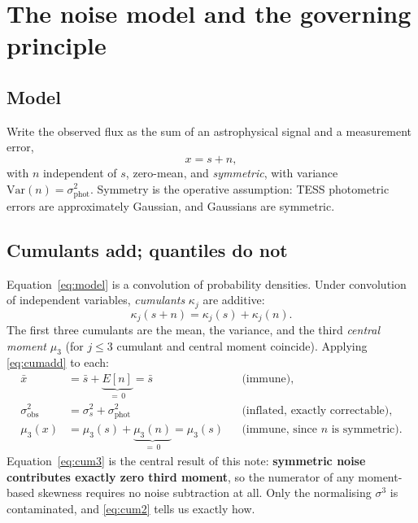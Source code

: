 \documentclass[11pt]{article}
\newcommand{\sigobs}{\sigma_{\mathrm{obs}}}
\newcommand{\sigphot}{\sigma_{\mathrm{phot}}}
\begin{document}
\section{The noise model and the governing principle}

\subsection{Model}

Write the observed flux as the sum of an astrophysical signal and a measurement
error,
%
\begin{equation}
  x = s + n,
  \label{eq:model}
\end{equation}
%
with $n$ independent of $s$, zero-mean, and \emph{symmetric}, with variance
$\mathrm{Var}(n) = \sigphot^2$. Symmetry is the operative assumption: TESS
photometric errors are approximately Gaussian, and Gaussians are symmetric.

\subsection{Cumulants add; quantiles do not}

Equation~\eqref{eq:model} is a convolution of probability densities. Under
convolution of independent variables, \emph{cumulants} $\kappa_j$ are additive:
%
\begin{equation}
  \kappa_j(s+n) = \kappa_j(s) + \kappa_j(n).
  \label{eq:cumadd}
\end{equation}
%
The first three cumulants are the mean, the variance, and the third \emph{central
moment} $\mu_3$ (for $j\le3$ cumulant and central moment coincide). Applying
\eqref{eq:cumadd} to each:
%
\begin{align}
  \bar{x}       &= \bar{s} + \underbrace{E[n]}_{=\,0} = \bar{s}
                 && \text{(immune)},
  \label{eq:cum1}\\
  \sigobs^{2}   &= \sigma_s^{2} + \sigphot^{2}
                 && \text{(inflated, exactly correctable)},
  \label{eq:cum2}\\
  \mu_3(x)      &= \mu_3(s) + \underbrace{\mu_3(n)}_{=\,0} = \mu_3(s)
                 && \text{(immune, since $n$ is symmetric)}.
  \label{eq:cum3}
\end{align}
%
Equation~\eqref{eq:cum3} is the central result of this note: \textbf{symmetric
noise contributes exactly zero third moment}, so the numerator of any
moment-based skewness requires no noise subtraction at all. Only the
normalising $\sigma^3$ is contaminated, and \eqref{eq:cum2} tells us exactly how.
\end{document}
